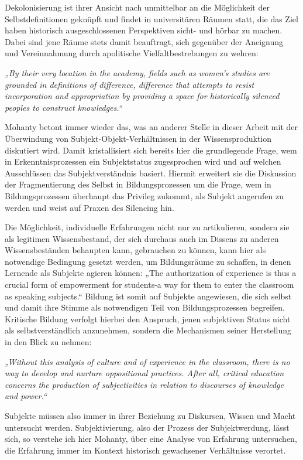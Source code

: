 \noindent Dekolonisierung ist ihrer Ansicht nach unmittelbar an die Möglichkeit der
Selbstdefinitionen geknüpft und findet in universitären Räumen statt, die das
Ziel haben historisch ausgeschlossenen Perspektiven sicht- und hörbar zu
machen.\footnotemark{} Dabei sind jene Räume stets damit beauftragt, sich gegenüber der Aneignung und Vereinnahmung durch apolitische Vielfaltbestrebungen zu wehren:
\begin{myenv} 
  \textit{„By their very location in the academy, fields such
    as women's studies are grounded in definitions of difference, difference
    that attempts to resist incorporation and appropriation by providing a
    space for historically silenced peoples to construct
    knowledges.“\footnotemark{} } \end{myenv}
Mohanty betont immer wieder das, was an anderer Stelle in dieser Arbeit mit
der Überwindung von Subjekt-Objekt-Verhältnissen in der Wissensproduktion
diskutiert wird. Damit kristallisiert sich bereits hier die grundlegende
Frage, wem in Erkenntnisprozessen ein Subjektstatus zugesprochen wird und
auf welchen Ausschlüssen das Subjektverständnis basiert. Hiermit erweitert
sie die Diskussion der Fragmentierung des Selbst in Bildungsprozessen um
die Frage, wem in Bildungsprozessen überhaupt das Privileg zukommt, als
Subjekt angerufen zu werden und weist auf Praxen des Silencing hin.

\noindent Die Möglichkeit, individuelle Erfahrungen nicht nur zu artikulieren, sondern
sie als legitimen Wissensbestand, der sich durchaus auch im Dissens zu anderen
Wissensbeständen behaupten kann, gebrauchen zu können, kann hier als notwendige
Bedingung gesetzt werden, um Bildungsräume zu schaffen, in denen Lernende als
Subjekte agieren können: „The authorization of experience is thus a crucial
form of empowerment for students-a way for them to enter the classroom as
speaking subjects.“\footnotemark{} Bildung ist somit auf Subjekte angewiesen, die sich selbst
und damit ihre Stimme als notwendigen Teil von Bildungsprozessen begreifen.\\
Kritische Bildung verfolgt hierbei den Anspruch, jenen subjektiven Status nicht
als selbstverständlich anzunehmen, sondern die Mechanismen seiner Herstellung
in den Blick zu nehmen: 
\begin{myenv} 
  \textit{
„Without this analysis of culture and of experience in the classroom, there is no way to develop and nurture oppositional practices. After all, critical education concerns the production of subjectivities in relation to discourses of knowledge and power.“\footnotemark{} } \end{myenv}
Subjekte müssen also immer in ihrer Beziehung zu Diskursen, Wissen und Macht
untersucht werden. Subjektivierung, also der Prozess der Subjektwerdung, lässt
sich, so verstehe ich hier Mohanty, über eine Analyse von Erfahrung
untersuchen, die Erfahrung immer im Kontext historisch gewachsener Verhältnisse
verortet. \\

